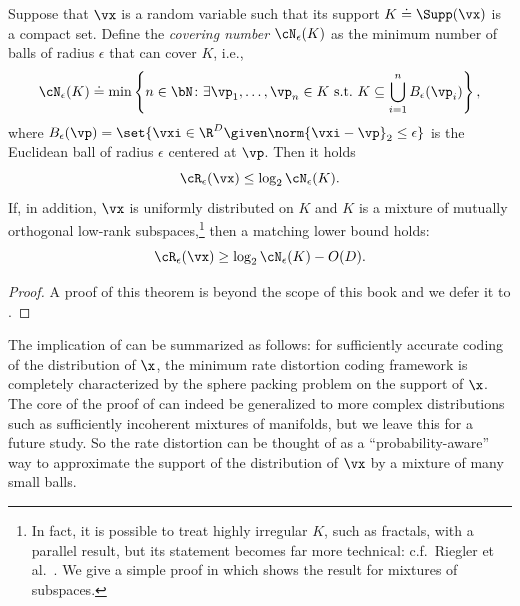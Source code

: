 \documentclass[../../book-main.tex]{subfiles}
\begin{document}
\begin{theorem}\label{thm:covering-number-rate-distortion}
	Suppose that \(\vx\) is a random variable such that its support \(K \doteq \Supp(\vx)\) is a compact set. Define the \textit{covering number} \(\cN_{\epsilon}(K)\) as the minimum number of balls of radius \(\epsilon\) that can cover \(K\), i.e.,
	\begin{equation}
		\cN_{\epsilon}(K) \doteq \min\left\{n \in \bN \colon \exists \vp_{1}, \dots, \vp_{n} \in K\ \text{s.t.}\ K \subseteq \bigcup_{i = 1}^{n}B_{\epsilon}(\vp_{i})\right\},
	\end{equation}
	where \(B_{\epsilon}(\vp) = \set{\vxi\in \R^D \given \norm{\vxi - \vp}_2 \leq
	\epsilon}\) is the Euclidean ball of radius \(\epsilon\) centered at \(\vp\).
	Then it holds 
	\begin{equation}
		\cR_{\epsilon}(\vx) 
		\leq \log_{2} \cN_{\epsilon}(K).
	\end{equation}
	If, in addition, $\vx$ is uniformly distributed on $K$ and $K$ is
	a mixture of mutually orthogonal low-rank subspaces,\footnote{In fact, it is
	possible to treat highly irregular $K$, such as fractals, with a parallel
	result, but its statement
	becomes far more technical: c.f.\ Riegler et al.\
	\cite{Riegler2018-jh,Riegler2023-rr}. We give a simple proof in
	 which shows the result for mixtures of
	subspaces.}
	then a matching lower bound holds:
	\begin{equation}
		\cR_{\epsilon}(\vx)
		\geq
		\log_{2} \cN_{\epsilon}(K) - O(D).
	\end{equation}
\end{theorem}
\begin{proof}
A proof of this theorem is beyond the scope of this book and we defer it to .
\end{proof}


The implication of  can be summarized
as follows: for sufficiently accurate coding of the distribution of
$\x$, the minimum rate distortion coding framework is completely characterized
by the sphere packing problem on the support of $\x$. 
The core of the proof of  can indeed
be generalized to more complex distributions such as sufficiently incoherent
mixtures of manifolds, but we leave this for a future study.
So the rate distortion can be thought of as a ``probability-aware'' way to
approximate the support of the distribution of
\(\vx\) by a mixture of many small balls.
\end{document}
